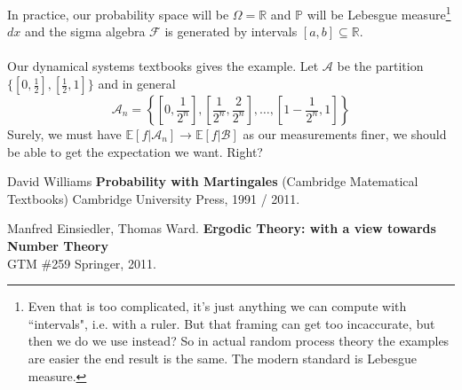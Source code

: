 \documentclass[12pt]{article}
\begin{document}
In practice, our probability space will be $\Omega = \mathbb{R}$ and $\mathbb{P}$ will be Lebesgue measure\footnote{Even that is too complicated, it's just anything we can compute with ``intervals", i.e. with a ruler.  But that framing can get too incaccurate, but then we do we use instead?  So in actual random process theory the examples are easier the end result is the same. The modern standard is Lebesgue measure.} $dx$ and the sigma algebra $\mathcal{F}$ is generated by intervals $[a,b] \subseteq \mathbb{R}$. \\ \\
Our dynamical systems textbooks gives the example.  Let $\mathcal{A}$ be the partition $\{[0, \frac{1}{2}], [\frac{1}{2}, 1]\}$ and in general 
$$ \mathcal{A}_n = \left\{ \left[0, \frac{1}{2^n}\right], \left[\frac{1}{2^n}, \frac{2}{2^n}\right], \dots, \left[1-\frac{1}{2^n}, 1\right]  \right\} $$
Surely, we must have $\mathbb{E}[f| \mathcal{A}_n] \to \mathbb{E}[f | \mathcal{B}]$ as our measurements finer, we should be able to get the expectation we want.  Right?

\vfill 

\begin{thebibliography}{}

\item David Williams \textbf{Probability with Martingales} (Cambridge Matematical Textbooks) Cambridge University Press, 1991 / 2011.

\item Manfred Einsiedler, Thomas Ward. \textbf{Ergodic Theory: with a view towards Number Theory} \\GTM \#259 Springer, 2011.


\end{thebibliography}
\end{document}
